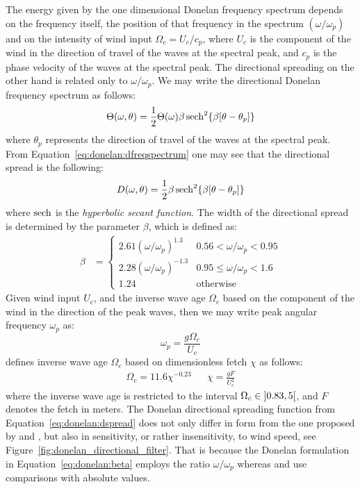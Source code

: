The energy given by the one dimensional Donelan frequency spectrum depends on 
the frequency itself, the position of that frequency in the spectrum 
$(\omega/\omega_p)$ and on the intensity of wind input $\Omega_c = U_c/c_p$, 
where $U_c$ is the component of the wind in the direction 
of travel of the waves at the spectral peak, and $c_p$ is the phase velocity of 
the waves at the spectral peak. The directional spreading on the other hand is 
related only to $\omega/\omega_p$. We may write the directional Donelan 
frequency spectrum as follows:
\begin{equation}
\label{eq:donelan:dfreqspectrum}
 \Theta(\omega, \theta) = \frac{1}{2}\Theta(\omega)\beta\operatorname{sech}^2
\{\beta[\theta - \theta_p]\}
\end{equation}
where $\theta_p$ represents the direction of travel of the waves at the 
spectral peak. From Equation~\ref{eq:donelan:dfreqspectrum} one may see that the
directional spread is the following:
\begin{equation}
\label{eq:donelan:dspread}
  D(\omega, \theta) = \frac{1}{2}\beta\operatorname{sech}^2\{\beta[\theta - \theta_p]\}
\end{equation}
where $\operatorname{sech}$ is the \emph{hyperbolic secant function}.
The width of the directional spread is determined by the
parameter $\beta$, which is defined as:
\begin{align}
\label{eq:donelan:beta}
\beta &= \begin{cases}
	2.61(\omega/\omega_p)^{1.3} & 0.56 < \omega/\omega_p < 0.95\\
	2.28(\omega/\omega_p)^{-1.3} & 0.95 \leq \omega/\omega_p < 1.6\\
	1.24 & \text{otherwise}
    \end{cases}
\end{align}
Given wind input $U_c$, and the inverse wave age $\Omega_c$ based on the
component of the wind in the direction of the peak waves, then we may
write peak angular frequency $\omega_p$ as:
\begin{equation}
 \omega_{p} = \frac{g\Omega_c}{U_{c}}
\end{equation}
\citeauthor{article:Donelan1985} defines inverse wave age $\Omega_c$ based on
dimensionless fetch $\chi$ as follows:
\begin{align}
\label{eq:donelan:omegac}
 \Omega_c = 11.6\chi^{-0.23} && \chi = \frac{gF}{U_{c}^{2}}
\end{align}
where the inverse wave age is restricted to
the interval ${\Omega_c\in\interval[open left, open right]{0.83}{5}}$,
and $F$ denotes the fetch in meters.
The Donelan directional spreading function from Equation~\ref{eq:donelan:dspread}
does not only differ in form from the one proposed by
\citet{article:Mitsuyasu1975} and \citet{article:Hasselmann1980},
but also in sensitivity, or rather insensitivity, to wind speed, see
Figure~\ref{fig:donelan_directional_filter}. That is because the Donelan
formulation in Equation~\ref{eq:donelan:beta} employs the ratio
$\omega/\omega_p$ whereas
\citeauthor{article:Mitsuyasu1975} and \citeauthor{article:Hasselmann1980}
use comparisons with absolute values.

